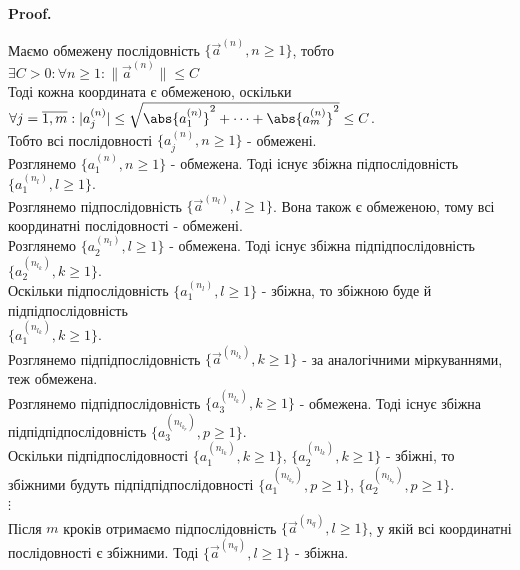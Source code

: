 \documentclass[a4paper, 10pt]{article}
\makeatletter
\def\qed{$\blacksquare$}
\theoremstyle{theoremdd}
\theoremstyle{theoremdd}
\theoremstyle{theoremdd}
\theoremstyle{theoremdd}
\theoremstyle{theoremdd}
\theoremstyle{theoremdd}
\theoremstyle{theoremdd}
\theoremstyle{theoremdd}
\theoremstyle{theoremdd}
\renewenvironment{proof}[1][Proof.\\]{\par
\pushQED{\hfill \qed}%
\normalfont \topsep6\p@\@plus6\p@\relax
\trivlist
\item\relax
{\bfseries
#1\@addpunct{.}}\hspace\labelsep\ignorespaces
}{%
\popQED\endtrivlist\@endpefalse
}
\newcommand\Norm[1]{\lVert#1\rVert}
\makeatother
\begin{document}
\begin{proof}
Маємо обмежену послідовність $\{\vec{a}^{(n)}, n \geq 1\}$, тобто $\exists C > 0: \forall n \geq 1: \Norm{\vec{a}^{(n)}} \leq C$\\
Тоді кожна координата є обмеженою, оскільки $\forall j = \overline{1,m}: |a_j^{(n)}| \leq \sqrt{\abs{a_1^{(n)}}^2 + \dots + \abs{a_m^{(n)}}^2} \leq C$.\\
Тобто всі послідовності $\{a_j^{(n)}, n \geq 1\}$ - обмежені.\\
Розглянемо $\{a_1^{(n)}, n \geq 1\}$ - обмежена. Тоді існує збіжна підпослідовність $\{a_1^{(n_l)}, l \geq 1\}$.\\
Розглянемо підпослідовність $\{\vec{a}^{(n_l)}, l \geq 1\}$. Вона також є обмеженою, тому всі координатні послідовності - обмежені.\\
Розглянемо $\{a_2^{(n_l)}, l \geq 1\}$ - обмежена. Тоді існує збіжна підпідпослідовність $\{a_2^{(n_{l_k})}, k \geq 1 \}$.\\
Оскільки підпослідовність $\{a_1^{(n_l)}, l \geq 1 \}$ - збіжна, то збіжною буде й підпідпослідовність \\ $\{a_1^{(n_{l_k})}, k \geq 1 \}$.\\
Розглянемо підпідпослідовність $\{\vec{a}^{(n_{l_k})}, k \geq 1\}$ - за аналогічними міркуваннями, теж обмежена.\\
Розглянемо підпідпослідовність $\{a_3^{(n_{l_k})}, k \geq 1 \}$ - обмежена. Тоді існує збіжна підпідпідпослідовність $\{a_3^{(n_{l_{k_p}})}, p \geq 1 \}$.\\
Оскільки підпідпослідовності $\{a_1^{(n_{l_k})}, k \geq 1 \}$, $\{a_2^{(n_{l_k})}, k \geq 1 \}$ - збіжні, то збіжними будуть підпідпідпослідовності  $\{a_1^{(n_{l_{k_p}})}, p \geq 1 \}$, $\{a_2^{(n_{l_{k_p}})}, p \geq 1 \}$.\\
$\vdots$
\\
Після $m$ кроків отримаємо підпослідовність $\{\vec{a}^{(n_q)}, l \geq 1\}$, у якій всі координатні послідовності є збіжними. Тоді $\{\vec{a}^{(n_q)}, l \geq 1\}$ - збіжна.
\end{proof}
\end{document}
